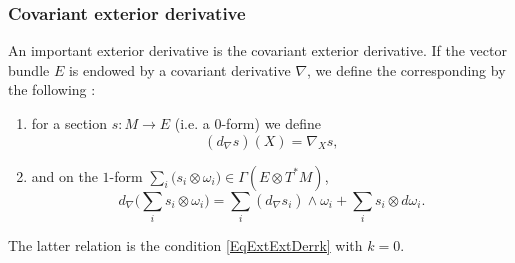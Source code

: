 \subsubsection{Covariant exterior derivative}

An important exterior derivative is the covariant exterior derivative. If the vector bundle $E$ is endowed by a covariant derivative $\nabla$, we define the corresponding  by the following :
{
\renewcommand{\theenumi}{\arabic{enumi}.}
\begin{enumerate}
\item for a section $s\colon M\to E$ (i.e. a $0$-form) we define
\begin{equation}
   (d_{\nabla}s)(X)=\nabla_Xs,
\end{equation}
\item and on the $1$-form $\sum_i(s_i\otimes\omega_i \big)\in\Gamma(E\otimes T^*M)$,
\begin{equation}
d_{\nabla}\big( \sum_is_i\otimes\omega_i \big)=\sum_i(d_{\nabla}s_i)\wedge\omega_i+\sum_is_i\otimes d\omega_i.
\end{equation}
\end{enumerate}
}		%
The latter relation is the condition \eqref{EqExtExtDerrk} with $k=0$.

